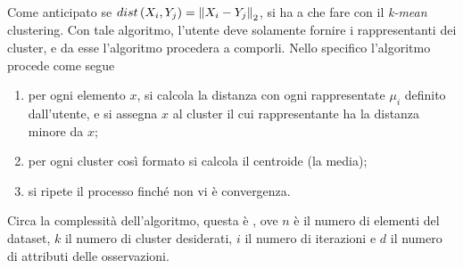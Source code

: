 \documentclass{subfiles}
\begin{document}
Come anticipato se $dist\left(X_{i}, Y_{j}\right) = \Norm{X_{i} - Y_{j}}$, si ha a che fare con il \emph{k-mean} clustering.
Con tale algoritmo, l'utente deve solamente fornire i rappresentanti dei cluster, e da esse l'algoritmo procedera a comporli.
Nello specifico l'algoritmo procede come segue
\begin{enumerate}
    \item per ogni elemento $x$, si calcola la distanza con ogni rappresentate \(\mu_{i}\) definito dall'utente,
          e si assegna $x$ al cluster il cui rappresentante ha la distanza minore da $x$;
    \item per ogni cluster così formato si calcola il centroide (la media);
    \item si ripete il processo finché non vi è convergenza\footnotemark[2].
\end{enumerate}

Circa la complessità dell'algoritmo, questa è , ove $n$ è il numero di elementi del dataset, $k$ il numero di cluster desiderati,
$i$ il numero di iterazioni e $d$ il numero di attributi delle osservazioni.
\end{document}
